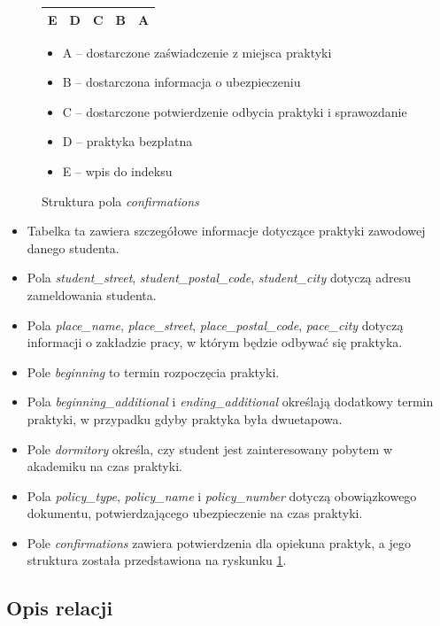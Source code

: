 \documentclass[a4paper,12pt,oneside]{report}
\begin{document}
\begin{figure}[h]
  \centering
  \begin{tabular}{|c|c|c|c|c|}\hline
  E & D & C & B & A \\\hline
  \end{tabular}
  \begin{itemize}
    \item A -- dostarczone zaświadczenie z miejsca praktyki
    \item B -- dostarczona informacja o ubezpieczeniu
    \item C -- dostarczone potwierdzenie odbycia praktyki i sprawozdanie
    \item D -- praktyka bezpłatna
    \item E -- wpis do indeksu
  \end{itemize}
  \caption{Struktura pola \emph{confirmations}\label{fig:confirmations}}
\end{figure}

\begin{itemize}
  \item Tabelka ta zawiera szczegółowe informacje dotyczące praktyki zawodowej danego studenta.
  \item Pola \emph{student\_street}, \emph{student\_postal\_code}, \emph{student\_city} dotyczą adresu zameldowania studenta.
  \item Pola \emph{place\_name}, \emph{place\_street}, \emph{place\_postal\_code}, \emph{pace\_city} dotyczą informacji o zakładzie pracy, w którym będzie odbywać się praktyka.
  \item Pole \emph{beginning} to termin rozpoczęcia praktyki.
  \item Pola \emph{beginning\_additional} i \emph{ending\_additional} określają dodatkowy termin praktyki, w przypadku gdyby praktyka była dwuetapowa.
  \item Pole \emph{dormitory} określa, czy student jest zainteresowany pobytem w akademiku na czas praktyki.
  \item Pola \emph{policy\_type}, \emph{policy\_name} i \emph{policy\_number} dotyczą obowiązkowego dokumentu, potwierdzającego ubezpieczenie na czas praktyki.
  \item Pole \emph{confirmations} zawiera potwierdzenia dla opiekuna praktyk, a jego struktura została przedstawiona na ryskunku \ref{fig:confirmations}.
\end{itemize}


\subsection{Opis relacji}
\label{sub:relacje}
\end{document}
